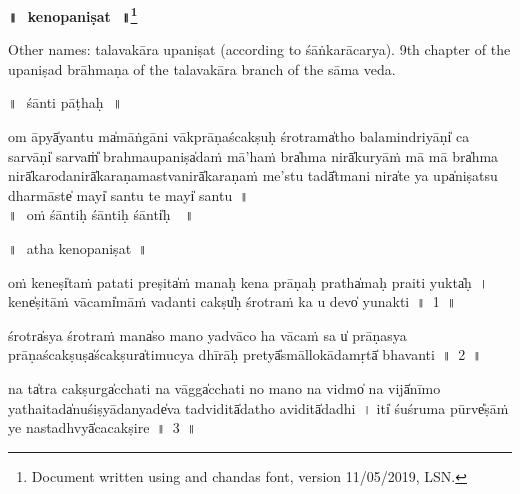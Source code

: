 \documentclass[parskip, DIV=14]{scrartcl}
\renewcommand{\thefootnote}{\fnsymbol{footnote}} %
\begin{document}

\vspace{-1.5cm}

\begin{center}
\textbf{{\Huge॥\,~kenopaniṣat\,~॥\LARGE\let\thefootnote\relax\footnote{\color{lightgray} Document written using \XeLaTeX{} and chandas font,  version 11/05/2019, LSN.}}}
\end{center}
\Large


{\centering	

\large
Other names:  talavakāra upaniṣat (according to śāṅkarācarya).
9th chapter of the upaniṣad brāhmaṇa of the talavakāra branch of the sāma veda.

\vspace{0.5cm}

\Large
॥\,~śānti pāṭhaḥ\,~॥\\
\vspace{0.5cm}

om āpyā̍yantu ma̍māṅgā॒ni vākprā॒ṇaśca॒kṣuḥ śro॒trama̍tho balami॒ndriyāṇi̍ ca sa॒rvāṇi̍ sa॒rvaṁ̎ brahmaupa॒niṣa̍daṁ mā'haṁ bra̍hma nirā̍kuryā॒ṁ mā mā bra̍hma nirā̍karo॒danirā̍karaṇamastva॒nirā̍karaṇaṁ me'stu॒ tadā̎tmani nira̍te ya॒ upa̍niṣatsu dha॒rmāste̍ mayi̍ santu॒ te mayi̍ santu~॥\\

\vspace{0.5cm}
          ॥\,~oṁ śānti॒ḥ śānti॒ḥ śānti̍ḥ \,~॥\
\vspace{0.5cm}

॥\,~atha kenopaniṣat~॥\\
\vspace{0.5cm}

oṁ ke॒neṣi̍taṁ patati pre॒ṣita̍ṁ manaḥ kena॒ prāṇa॒ḥ pratha̍maḥ praiti॒ yukta̍ḥ~।
kene̍ṣitāṁ vā॒cami̍māṁ vadanti
    cakṣu̍ḥ śro॒traṁ ka u॒ devo̍ yunakti~॥~1~॥
    
śrotra̍sya śro॒traṁ mana̍so ma॒no yadvā॒co ha vā॒caṁ sa u̍ prā॒ṇasya prā॒ṇaśca॒kṣuṣa̍śca॒kṣura̍timucya dhī॒rāḥ
    pretyā̎smāllo॒kāda॒mṛtā̍ bhavanti~॥~2~॥
    
na ta̍tra ca॒kṣurga̍cchati na॒ vāgga̍cchati no॒ mano॒ %
na vidmo̍ na॒ vijā̍nīmo yathai॒tada̍nuśiṣyāda॒nyade̍va tadvi॒ditā̍datho a॒viditā̍dadhi~।
iti̍ śuśruma॒ pūrve̎ṣā॒ṁ ye na॒stadhvyā̍cacakṣi॒re~॥~3~॥

}
\end{document}
